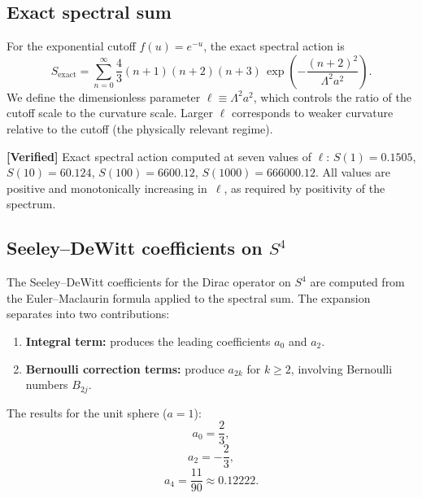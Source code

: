 \documentclass[11pt,a4paper]{article}
\newcommand{\Lam}{\Lambda}
\theoremstyle{plain}
\theoremstyle{definition}
\newcommand{\verified}[1]{%
  \par\smallskip\noindent
  \colorbox{green!10}{\parbox{\dimexpr\linewidth-2\fboxsep}{%
    \textcolor{green!50!black}{\textbf{[Verified]}} #1}}%
  \par\smallskip}
\begin{document}
\subsection{Exact spectral sum}

For the exponential cutoff $f(u) = e^{-u}$, the exact spectral action is
\begin{equation}\label{eq:S-exact}
  S_{\text{exact}} = \sum_{n=0}^{\infty}
  \frac{4}{3}(n+1)(n+2)(n+3)\,
  \exp\!\left(-\frac{(n+2)^2}{\Lam^2 a^2}\right).
\end{equation}
We define the dimensionless parameter
$\ell \equiv \Lam^2 a^2$, which controls the ratio of the cutoff scale to the
curvature scale.  Larger $\ell$ corresponds to weaker curvature
relative to the cutoff (the physically relevant regime).

\verified{Exact spectral action computed at seven values of $\ell$:
$S(1) = 0.1505$, $S(10) = 60.124$, $S(100) = 6600.12$,
$S(1000) = 666000.12$.  All values are positive and monotonically increasing
in~$\ell$, as required by positivity of the spectrum.}

\subsection{Seeley--DeWitt coefficients on \texorpdfstring{$S^4$}{S4}}

The Seeley--DeWitt coefficients for the Dirac operator on $S^4$ are computed
from the Euler--Maclaurin formula applied to the spectral sum.
The expansion separates into two contributions:

\begin{enumerate}
  \item \textbf{Integral term:} produces the leading coefficients $a_0$ and $a_2$.
  \item \textbf{Bernoulli correction terms:} produce $a_{2k}$ for $k \geq 2$,
    involving Bernoulli numbers $B_{2j}$.
\end{enumerate}

The results for the unit sphere ($a = 1$):
\begin{equation}\label{eq:a0-s4}
  a_0 = \frac{2}{3},
\end{equation}
\begin{equation}\label{eq:a2-s4}
  a_2 = -\frac{2}{3},
\end{equation}
\begin{equation}\label{eq:a4-s4}
  a_4 = \frac{11}{90} \approx 0.12222.
\end{equation}
\end{document}
